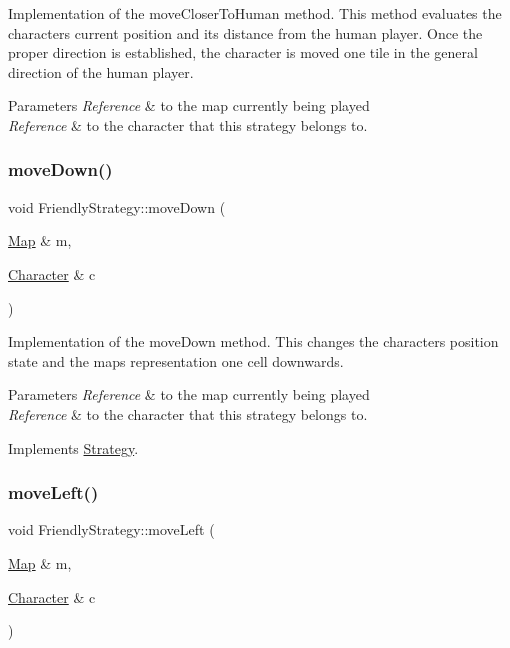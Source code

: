 Implementation of the move\+Closer\+To\+Human method. This method evaluates the character\textquotesingle{}s current position and its distance from the human player. Once the proper direction is established, the character is moved one tile in the general direction of the human player. 
\begin{DoxyParams}{Parameters}
{\em Reference} & to the map currently being played \\
\hline
{\em Reference} & to the character that this strategy belongs to. \\
\hline
\end{DoxyParams}
\hypertarget{classFriendlyStrategy_a51c3a2bee7a69fed0edd17ec75ba4591}{}\label{classFriendlyStrategy_a51c3a2bee7a69fed0edd17ec75ba4591} 
\subsubsection{\texorpdfstring{move\+Down()}{moveDown()}}
{\footnotesize\ttfamily void Friendly\+Strategy\+::move\+Down (\begin{DoxyParamCaption}\item[{\hyperlink{classMap}{Map} \&}]{m,  }\item[{\hyperlink{classCharacter}{Character} \&}]{c }\end{DoxyParamCaption})\hspace{0.3cm}{\ttfamily [virtual]}}

Implementation of the move\+Down method. This changes the character\textquotesingle{}s position state and the map\textquotesingle{}s representation one cell downwards. 
\begin{DoxyParams}{Parameters}
{\em Reference} & to the map currently being played \\
\hline
{\em Reference} & to the character that this strategy belongs to. \\
\hline
\end{DoxyParams}


Implements \hyperlink{classStrategy}{Strategy}.

\hypertarget{classFriendlyStrategy_a1b3ca725bd0018401cc27d4ff05885b4}{}\label{classFriendlyStrategy_a1b3ca725bd0018401cc27d4ff05885b4} 
\subsubsection{\texorpdfstring{move\+Left()}{moveLeft()}}
{\footnotesize\ttfamily void Friendly\+Strategy\+::move\+Left (\begin{DoxyParamCaption}\item[{\hyperlink{classMap}{Map} \&}]{m,  }\item[{\hyperlink{classCharacter}{Character} \&}]{c }\end{DoxyParamCaption})\hspace{0.3cm}{\ttfamily [virtual]}}

